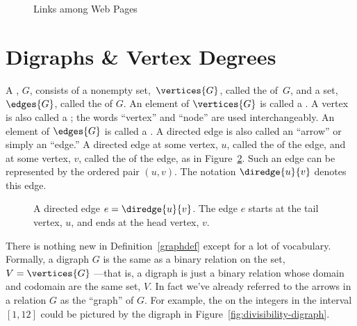 \iffalse

and in the following graph the vertices $x_1, \ldots, x_n$ correspond
to web pages and $\diredge{x_i}{x_j}$ is a directed edge when page
$x_i$ contains a hyperlink to page $x_j$.
\fi


\begin{figure}


\caption{Links among Web Pages}

\label{webpage-links}

\end{figure}

\section{Digraphs \& Vertex Degrees}

\begin{definition}\label{graphdef}
  A , $G$, consists of a nonempty
  set,~$\vertices{G}$, called the  of~$G$, and a set,
  $\edges{G}$, called the  of $G$.  An element of
  $\vertices{G}$ is called a .  A vertex is also called a
  ; the words ``vertex'' and ``node'' are used
  interchangeably.  An element of $\edges{G}$ is called a
  .  A directed edge is also called an ``arrow''
  or simply an ``edge.''  A directed edge  at some vertex, $u$, called the 
  of the edge, and  at some vertex,
  $v$, called the  of the edge, as in Figure~\ref{fig:6EA}.
  Such an edge can be represented by the ordered pair $(u,v)$.  The
  notation $\diredge{u}{v}$ denotes this edge.
\end{definition}

\begin{figure}


\caption{A directed edge $e = \diredge{u}{v}$.  The edge $e$ starts at
  the tail vertex, $u$, and ends at the head vertex, $v$.}

\label{fig:6EA}
\end{figure}

There is nothing new in Definition~\ref{graphdef} except for a lot of
vocabulary.  Formally, a digraph $G$ is the same as a binary relation
on the set, $V = \vertices{G}$ ---that is, a digraph is just a binary
relation whose domain and codomain are the same set, $V$.  In fact
we've already referred to the arrows in a relation $G$ as the
``graph'' of $G$.  For example, the  on the
integers in the interval $[1,12]$ could be pictured by the digraph in
Figure~\ref{fig:divisibility-digraph}.

